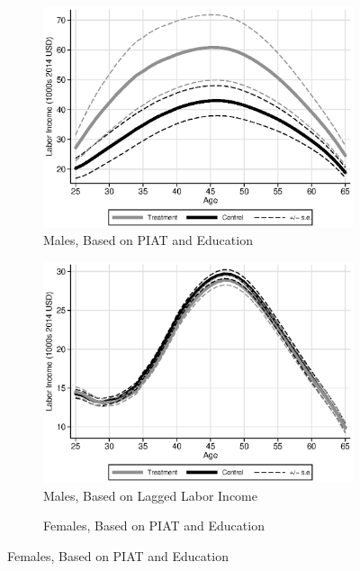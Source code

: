 \setcounter{figure}{4}
\begin{figure}
\centering
\caption{Forecasted Labor Income Profiles for ABC/CARE Participants}\label{fig:labor-income-profilessens}
\begin{subfigure}[h]{0.35\textwidth}
		\centering
		\caption{Males, Based on PIAT and Education}
		\includegraphics[width=\textwidth]{output/labor_25-60_male_2}
\end{subfigure}%
\begin{subfigure}[h]{0.35\textwidth}
		\centering
		\caption{Males, Based on Lagged Labor Income} 
		\includegraphics[width=\textwidth]{output/labor_25-60_male_3}
\end{subfigure}
\begin{subfigure}[h]{0.35\textwidth}
		\centering
		\caption{Females, Based on PIAT and Education} 

\end{subfigure}
\end{figure}
